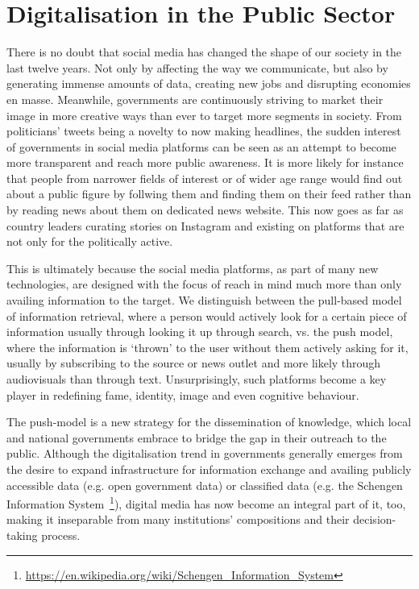 
\section{Digitalisation in the Public Sector}

There is no doubt that social media has changed the shape of our society in the last twelve years. Not only by affecting the way we communicate, but also by generating immense amounts of data, creating new jobs and disrupting economies en masse.
Meanwhile, governments are continuously striving to market their image in more creative ways than ever to target more segments in society. From politicians' tweets being a novelty to now making headlines, the sudden interest of governments in social media platforms 
can be seen as an attempt to become more transparent and reach more public awareness. It is more likely for instance that people from narrower fields of interest or of wider age range
would find out about a public figure by follwing them and finding them on their feed
rather than by reading news about them on dedicated news website.
This now goes as far as country leaders curating stories on Instagram and existing on platforms that are not only for the politically active.


This is ultimately because the social media platforms, as part of many new technologies, are designed with the focus of reach in mind much more than only availing information to the target.
We distinguish between the pull-based model of information retrieval, where a person would actively look for a certain piece of information usually through looking it up through search, vs. the push model, where the information is `thrown' to the user without them actively asking for it, usually by subscribing to the source or news outlet and more likely through audiovisuals than through text. Unsurprisingly, such platforms become a key player in redefining fame, identity, image and even cognitive behaviour.

The push-model is a new strategy for the dissemination of knowledge, which local and national governments %
embrace \cite{forbes:govOutreach} to bridge the gap in their outreach to the public. 
Although the digitalisation trend in governments generally emerges from the desire to expand infrastructure for information exchange and availing publicly accessible data (e.g. open government data) \cite{un:egovReport} or classified data (e.g. the Schengen Information System~\footnote{\url{https://en.wikipedia.org/wiki/Schengen_Information_System}}), digital media has now become an integral part of it, too, making it inseparable from many institutions' compositions and their decision-taking process. 


